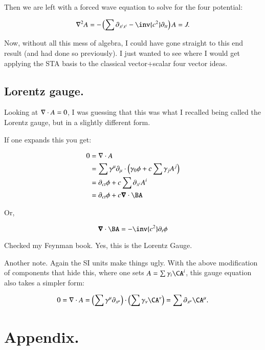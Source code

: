 Then we are left with a forced wave equation to solve for the four potential:

\begin{equation*}
\grad^2 A = -\left(\sum \partial_{x^i x^i} - \inv{c^2}\partial_{tt}\right) A = J.
\end{equation*}

Now, without all this mess of algebra, I could have gone straight to this end result (and had done so previously).  I just
wanted to see where I would get applying the STA basis to the classical vector+scalar four vector ideas.

\subsection{Lorentz gauge. }

Looking at $\nabla \cdot A = 0$, I was guessing that this was what I recalled being called the Lorentz gauge, but in a
slightly different form.

If one expands this you get:

\begin{align*}
0 
&= \grad \cdot A \\
&= \sum \gamma^{\mu} \partial_{\mu} \cdot \left(\gamma_0 \phi + c \sum \gamma_j A^j \right) \\
&= \partial_{ct} \phi + c \sum \partial_{x^i}A^i \\
&= \partial_{ct} \phi + c \spacegrad \cdot \BA
\end{align*}

Or,

\begin{equation}
\spacegrad \cdot \BA = -\inv{c^2}\partial_{t} \phi
\end{equation}

Checked my Feynman book.  Yes, this is the Lorentz Gauge.

Another note.  Again the SI units make things ugly.  With the above modification of components that hide this, where one sets $A = \sum \gamma_i \CA^i$, this gauge equation also takes a simpler form:

\begin{equation*}
0 = \grad \cdot A = \left(\sum \gamma^{\mu} \partial_{x^{\mu}}\right) \cdot \left(\sum \gamma_{\nu} \CA^{\nu}\right) = \sum \partial_{x^{\mu}} \CA^{\mu}.
\end{equation*}

\section{Appendix. }

